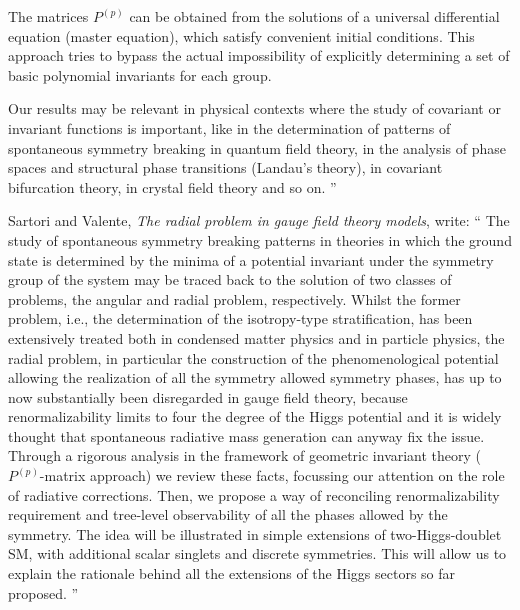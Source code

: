 \begin{description}
The matrices $P^{(p)}$ can be obtained from the solutions of a universal
differential equation (master equation), which satisfy convenient initial
conditions. This approach tries to bypass the actual impossibility of
explicitly determining a set of basic polynomial invariants for each
group.

Our results may be relevant in physical contexts where the study of
covariant or invariant functions is important, like in the determination
of patterns of spontaneous symmetry breaking in quantum field theory, in
the analysis of phase spaces and structural phase transitions (Landau's
theory), in covariant bifurcation theory, in crystal field theory and so
on.
''

Sartori and Valente, {\em The radial problem in
gauge field theory models}, write: ``
The study of spontaneous symmetry breaking patterns in theories in which
the ground state is determined by the minima of a potential invariant
under the symmetry group of the system may be traced back to the solution
of two classes of problems, the angular and radial problem, respectively.
Whilst the former problem, i.e., the determination of the isotropy-type
stratification, has been extensively treated both in condensed matter
physics and in particle physics, the radial problem, in particular the
construction of the phenomenological potential allowing the realization
of all the symmetry allowed symmetry phases, has up to now substantially
been disregarded in gauge field theory, because renormalizability limits
to four the degree of the Higgs potential and it is widely thought that
spontaneous radiative mass generation can anyway fix the issue. Through a
rigorous analysis in the framework of geometric invariant theory
($P^{(p)}$-matrix approach) we review these facts, focussing our
attention on the role of radiative corrections. Then, we propose a way of
reconciling renormalizability requirement and tree-level observability of
all the phases allowed by the symmetry. The idea will be illustrated in
simple extensions of two-Higgs-doublet SM, with additional scalar
singlets and discrete symmetries. This will allow us to explain the
rationale behind all the extensions of the Higgs sectors so far proposed.
''


\end{description}
